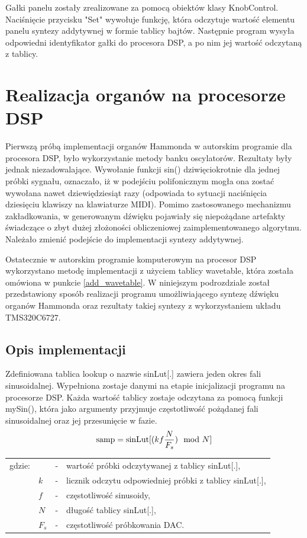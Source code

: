 Gałki panelu zostały zrealizowane za pomocą obiektów klasy KnobControl. Naciśnięcie przycisku "Set" wywołuje funkcję, która odczytuje wartość elementu panelu syntezy addytywnej w formie tablicy bajtów. Następnie program wysyła odpowiedni identyfikator gałki do procesora DSP, a po nim jej wartość odczytaną z tablicy.

\section{Realizacja organów na procesorze DSP}
Pierwszą próbą implementacji organów Hammonda w autorskim programie dla procesora DSP, było wykorzystanie metody banku oscylatorów. Rezultaty były jednak niezadowalające. Wywołanie funkcji sin() dziwięciokrotnie dla jednej próbki sygnału, oznaczało, iż w podejściu polifonicznym mogła ona zostać wywołana nawet dziewiędziesiąt razy (odpowiada to sytuacji naciśnięcia dziesięciu klawiszy na klawiaturze MIDI).
Pomimo zastosowanego mechanizmu zakładkowania, w generowanym dźwięku pojawiały się niepożądane artefakty świadczące o zbyt dużej złożoności obliczeniowej zaimplementowanego algorytmu. Należało zmienić podejście do implementacji syntezy addytywnej.

Ostatecznie w autorskim programie komputerowym na procesor DSP wykorzystano metodę implementacji z użyciem tablicy wavetable, która została omówiona w punkcie \ref{add_wavetable}. W niniejszym podrozdziale został przedstawiony sposób realizacji programu umożliwiającego syntezę dźwięku organów Hammonda oraz rezultaty takiej syntezy z wykorzystaniem układu TMS320C6727.

\subsection{Opis implementacji}
Zdefiniowana tablica lookup o nazwie sinLut[.] zawiera jeden okres fali sinusoidalnej. Wypełniona zostaje danymi na etapie inicjalizacji programu na procesorze DSP. Każda wartość tablicy zostaje odczytana za pomocą funkcji mySin(), która jako argumenty przyjmuje częstotliwość pożądanej fali sinusoidalnej oraz jej przesunięcie w fazie.
\begin{equation} \label{equ:addit_sinLut}
\text{samp} = \text{sinLut}[(kf\frac{N}{F_s})\mod{N}] \\  
\end{equation}
\begin{tabular}{ l l l l}
	gdzie: & \text{samp} &  - & wartość próbki odczytywanej z tablicy sinLut[.], \\
	& $k$ &  - & licznik odczytu odpowiedniej próbki z tablicy sinLut[.], \\
	& $f$ & - & częstotliwość sinusoidy, \\
	& $N$ & - & długość tablicy sinLut[.], \\
	& $F_s$ & - & częstotliwość próbkowania DAC. \\
\end{tabular} \\

